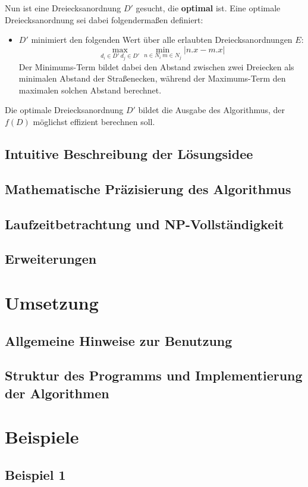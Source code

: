 \documentclass[a4paper, notitlepage, 12pt]{scrartcl}
\begin{document}
Nun ist eine Dreiecksanordnung $D'$ gesucht, die \textbf{optimal} ist. Eine optimale Dreiecksanordnung sei dabei folgendermaßen definiert:
\begin{itemize}
	\item $D'$ minimiert den folgenden Wert über alle erlaubten Dreiecksanordnungen $E$:
	\begin{equation}
	\max_{d_i \in D' ~ d_j \in D'} \min_{n \in N_i ~ m \in N_j} | n.x - m.x |
	\end{equation}
	Der Minimums-Term bildet dabei den Abstand zwischen zwei Dreiecken als minimalen Abstand der Straßenecken, während der Maximums-Term den maximalen solchen Abstand berechnet.
\end{itemize}
 Die optimale Dreiecksanordnung $D'$ bildet die Ausgabe des Algorithmus, der $f(D)$ möglichst effizient berechnen soll.
 \subsection{Intuitive Beschreibung der Lösungsidee}
 \subsection{Mathematische Präzisierung des Algorithmus}
 \subsection{Laufzeitbetrachtung und NP-Vollständigkeit}
 \subsection{Erweiterungen}

\section{Umsetzung}
\subsection{Allgemeine Hinweise zur Benutzung}
\subsection{Struktur des Programms und Implementierung der Algorithmen}

\section{Beispiele}
\subsection{Beispiel 1}
\end{document}
